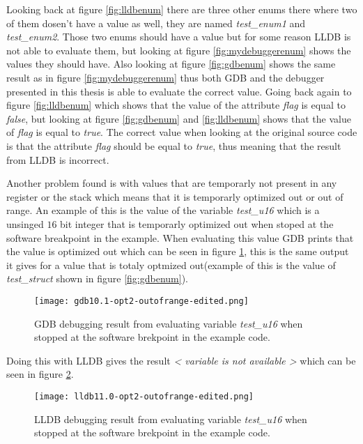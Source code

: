 Looking back at figure \ref{fig:lldbenum} there are three other enums there where two of them dosen't have a value as well, they are named \emph{test\_enum1} and \emph{test\_enum2}.
Those two enums should have a value but for some reason \gls{LLDB} is not able to evaluate them, but looking at figure \ref{fig:mydebuggerenum} shows the values they should have.
Also looking at figure \ref{fig:gdbenum} shows the same result as in figure \ref{fig:mydebuggerenum} thus both \gls{GDB} and the debugger presented in this thesis is able to evaluate the correct value.
Going back again to figure \ref{fig:lldbenum} which shows that the value of the attribute \emph{flag} is equal to \emph{false}, but looking at figure \ref{fig:gdbenum} and \ref{fig:lldbenum} shows that the value of \emph{flag} is equal to \emph{true}.
The correct value when looking at the original source code is that the attribute \emph{flag} should be equal to \emph{true}, thus meaning that the result from \gls{LLDB} is incorrect.


Another problem found is with values that are temporarly not present in any register or the stack which means that it is temporarly optimized out or out of range.
An example of this is the value of the variable \emph{test\_u16} which is a unsinged $16$ bit integer that is temporarly optimized out when stoped at the software breakpoint in the example.
When evaluating this value \gls{GDB} prints that the value is optimized out which can be seen in figure \ref{fig:gdboutofrange}, this is the same output it gives for a value that is totaly optmized out(example of this is the value of \emph{test\_struct} shown in figure \ref{fig:gdbenum}).


\begin{figure}[h]
	\centering
	\texttt{[image: gdb10.1-opt2-outofrange-edited.png]}
	\caption{\gls{GDB} debugging result from evaluating variable \emph{test\_u16} when stopped at the software brekpoint in the example code.}
    	\label{fig:gdboutofrange}
\end{figure}


Doing this with \gls{LLDB} gives the result  \emph{< variable is not available >} which can be seen in figure \ref{fig:lldboutofrange}.


\begin{figure}[h]
	\centering
	\texttt{[image: lldb11.0-opt2-outofrange-edited.png]}
	\caption{\gls{LLDB} debugging result from evaluating variable \emph{test\_u16} when stopped at the software brekpoint in the example code.}
	\label{fig:lldboutofrange}
\end{figure}



